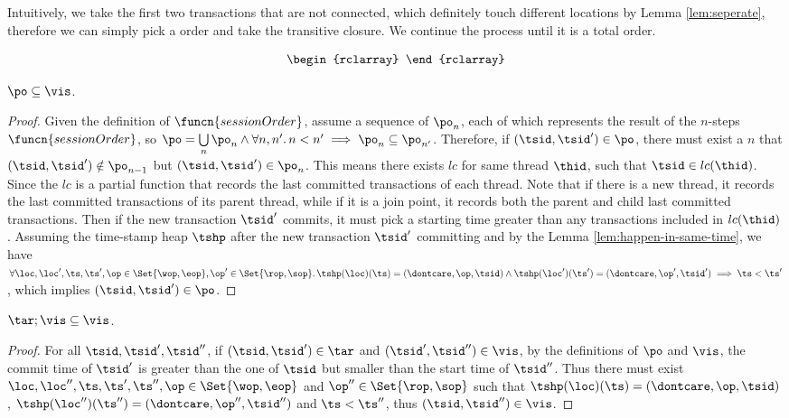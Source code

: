 Intuitively, we take the first two transactions that are not connected, which definitely touch different locations by Lemma \ref{lem:seperate}, therefore we can simply pick a order and take the transitive closure.
We continue the process until it is a total order.

\begin{defn}
    \[
        \begin{rclarray}

        \end{rclarray}
    \]
\end{defn}

\begin{lem}[Session]
    \( \po \subseteq \vis \).
\end{lem}   
\begin{proof}
    Given the definition of \( \funcn{sessionOrder} \), assume a sequence of \( \po_n \), each of which represents the result of the \( n \)-steps \(\funcn{sessionOrder} \), so \( \po = \bigcup\limits_{n} \po_n \land \forall n, n' \ldotp n < n' \implies \po_n \subseteq \po_{n'} \).
    Therefore, if \( ( \tsid , \tsid' ) \in \po \), there must exist a \( n \) that \( ( \tsid , \tsid' ) \notin \po_{n-1} \) but \( ( \tsid , \tsid' ) \in \po_{n} \).
    This means there exists \( lc \) for same thread \( \thid \), such that \( \tsid \in lc(\thid) \).
    Since the \( lc \) is a partial function that records the last committed transactions of each thread.
    Note that if there is a new thread, it records the last committed transactions of its parent thread, while if it is a join point, it records both the parent and child last committed transactions.
    Then if the new transaction \( \tsid' \) commits, it must pick a starting time greater than any transactions included in \( lc(\thid) \).
    Assuming the time-stamp heap \( \tshp \) after the new transaction \( \tsid' \) committing and by the Lemma \ref{lem:happen-in-same-time}, we have \( \forall \loc, \loc', \ts, \ts', \op \in \Set{\wop,\eop}, \op' \in \Set{\rop,\sop} \ldotp \tshp(\loc)(\ts) = (\dontcare, \op, \tsid) \land \tshp(\loc')(\ts') = (\dontcare, \op', \tsid') \implies \ts < \ts' \), which implies \( (\tsid, \tsid') \in \po \).
\end{proof}

\begin{lem}[prefix]
    \label{lem:prefix}
    \( \tar; \vis \subseteq \vis \).
\end{lem}
\begin{proof}
    For all \( \tsid, \tsid', \tsid'' \), if \( (\tsid, \tsid') \in \tar \) and \( (\tsid', \tsid'') \in \vis \), by the definitions of \( \po \) and \( \vis \), the commit time of \( \tsid' \) is greater than the one of \( \tsid \) but smaller than the start time of \( \tsid'' \).
    Thus there must exist \( \loc, \loc'', \ts, \ts' , \ts'', \op \in \Set{\wop, \eop}  \) and \( \op'' \in \Set{\rop, \sop } \) such that  \( \tshp(\loc)(\ts) = (\dontcare, \op, \tsid) \), \( \tshp(\loc'')(\ts'') = (\dontcare, \op'', \tsid'') \) and \( \ts < \ts'' \), thus \( ( \tsid, \tsid'' ) \in \vis \).
\end{proof}

